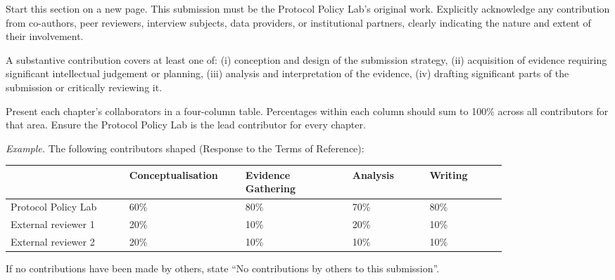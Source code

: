 \begin{instructional}
Start this section on a new page. This submission must be the Protocol Policy Lab's original work. Explicitly acknowledge any contribution from co-authors, peer reviewers, interview subjects, data providers, or institutional partners, clearly indicating the nature and extent of their involvement.

A substantive contribution covers at least one of: (i) conception and design of the submission strategy, (ii) acquisition of evidence requiring significant intellectual judgement or planning, (iii) analysis and interpretation of the evidence, (iv) drafting significant parts of the submission or critically reviewing it.

Present each chapter's collaborators in a four-column table. Percentages within each column should sum to 100\% across all contributors for that area. Ensure the Protocol Policy Lab is the lead contributor for every chapter.
\end{instructional}

\noindent\textit{Example.} The following contributors shaped  (Response to the Terms of Reference):

\begin{table}[ht]
    \centering
    \begin{tabular}{|p{0.20\linewidth}|p{0.18\linewidth}|p{0.18\linewidth}|p{0.13\linewidth}|p{0.13\linewidth}|}
        \hline
                                       & Conceptualisation & Evidence Gathering & Analysis & Writing \\
        \hline
        Protocol Policy Lab            & 60\%              & 80\%               & 70\%     & 80\%    \\
        \hline
        External reviewer 1            & 20\%                       & 10\%                        & 20\%              & 10\%             \\
        \hline
        External reviewer 2            & 20\%                       & 10\%                        & 10\%              & 10\%             \\
        \hline
    \end{tabular}
\end{table}

\begin{instructional}
If no contributions have been made by others, state ``No contributions by others to this submission''.
\end{instructional}


